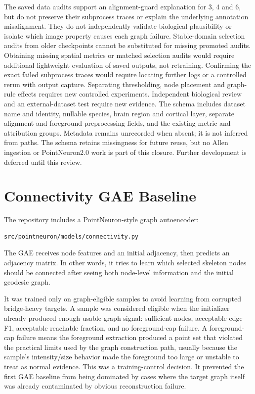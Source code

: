 \documentclass[11pt]{article}
\begin{document}
The saved data audits support an alignment-guard explanation for 3, 4 and 6,
but do not preserve their subprocess traces or explain the underlying annotation
misalignment. They do not independently validate biological plausibility or
isolate which image property causes each graph failure. Stable-domain selection audits from older checkpoints
cannot be substituted for missing promoted audits. Obtaining missing spatial
metrics or matched selection audits would require additional lightweight
evaluation of saved outputs, not retraining. Confirming the exact failed subprocess
traces would require locating further logs or a controlled rerun with output
capture. Separating thresholding, node placement and graph-rule effects requires
new controlled experiments. Independent biological review and an external-dataset
test require new evidence. The schema includes dataset name and identity,
nullable species, brain region and cortical layer, separate alignment and
foreground-preprocessing fields, and the existing metric and attribution groups.
Metadata remains unrecorded when absent; it is not inferred from paths.
The schema retains missingness for future reuse, but no Allen ingestion or PointNeuron2.0 work is
part of this closure. Further development is deferred until this review.

\section{Connectivity GAE Baseline}

The repository includes a PointNeuron-style graph autoencoder:

\begin{lstlisting}
src/pointneuron/models/connectivity.py
\end{lstlisting}

The GAE receives node features and an initial adjacency, then predicts an
adjacency matrix. In other words, it tries to learn which selected skeleton
nodes should be connected after seeing both node-level information and the
initial geodesic graph.

It was trained only on graph-eligible samples to avoid learning from corrupted
bridge-heavy targets. A sample was considered eligible when the initializer
already produced enough usable graph signal: sufficient nodes, acceptable edge
F1, acceptable reachable fraction, and no foreground-cap failure. A
foreground-cap failure means the foreground extraction produced a point set that
violated the practical limits used by the graph construction path, usually
because the sample's intensity/size behavior made the foreground too large or
unstable to treat as normal evidence. This was a
training-control decision. It prevented the first GAE baseline from being
dominated by cases where the target graph itself was already contaminated by
obvious reconstruction failure.
\end{document}

